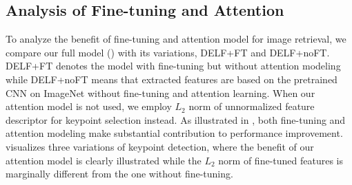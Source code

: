 \documentclass[10pt,twocolumn,letterpaper]{article}
\begin{document}
\subsection{Analysis of Fine-tuning and Attention}
\label{sub:annalysis}
To analyze the benefit of fine-tuning and attention model for image retrieval, we compare our full model () with its variations, DELF+FT and DELF+noFT.
DELF+FT denotes the model with fine-tuning but without attention modeling while DELF+noFT means that extracted features are based on the pretrained CNN on ImageNet without fine-tuning and attention learning.
When our attention model is not used, we employ $L_2$ norm of unnormalized feature descriptor for keypoint selection instead.
As illustrated in , both fine-tuning and attention modeling make substantial contribution to performance improvement.
 visualizes three variations of keypoint detection, where the benefit of our attention model is clearly illustrated while the $L_2$ norm of fine-tuned features is marginally different from the one without fine-tuning.
\fi

\iffalse
\figref{fig:vis_att} presents a visualization of the different keypoint selection methods, for some images.
Qualitatively, it shows that the $L_2$ norm scores benefit from fine-tuning; scores for image regions without landmarks (\eg, faces, people) are suppressed, and scores for regions containing landmarks are boosted.
A substantial difference can be observed between attention and $L_2$ scores; the attention portion of the network produces high scores for landmark regions while significantly suppressing clutter which is irrelevant for the landmark recognition task.
\fi
\end{document}
